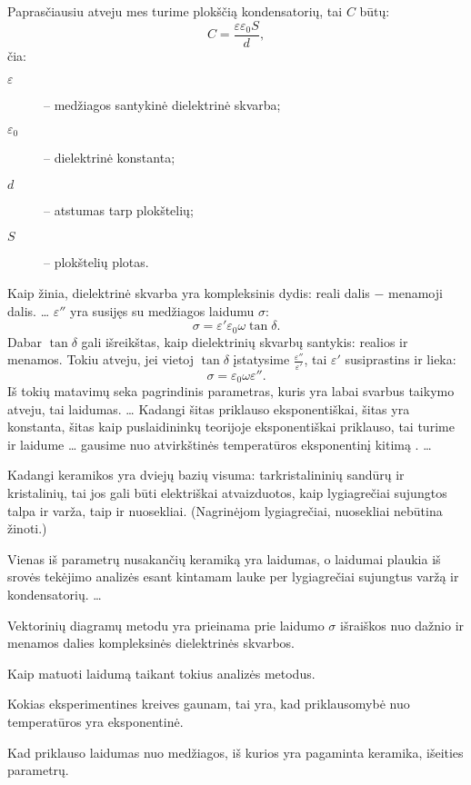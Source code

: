 Paprasčiausiu atveju mes turime plokščią kondensatorių, tai $C$ būtų:
\begin{equation*}
  C = \frac{\varepsilon \varepsilon_{0} S}{d},
\end{equation*}
čia:
\begin{description}
  \item[$\varepsilon$] – medžiagos santykinė dielektrinė skvarba;
  \item[$\varepsilon_{0}$] – dielektrinė konstanta;
  \item[$d$] – atstumas tarp plokštelių;
  \item[$S$] – plokštelių plotas.
\end{description}
Kaip žinia, dielektrinė skvarba yra kompleksinis dydis: reali dalis
$-$ menamoji dalis. … $\varepsilon''$ yra susijęs su medžiagos
laidumu $\sigma$:
\begin{equation*}
  \sigma = \varepsilon' \varepsilon_{0} \omega \tan \delta.
\end{equation*}
Dabar $\tan \delta$ gali išreikštas, kaip dielektrinių skvarbų santykis:
realios ir menamos. Tokiu atveju, jei vietoj $\tan \delta$ įstatysime
$\frac{\varepsilon''}{\varepsilon'}$, tai $\varepsilon'$ susiprastins
ir lieka:
\begin{equation*}
  \sigma = \varepsilon_{0} \omega \varepsilon''.
\end{equation*}
Iš tokių matavimų seka pagrindinis parametras, kuris yra labai
svarbus taikymo atveju, tai laidumas. … Kadangi šitas
priklauso eksponentiškai, šitas yra konstanta, šitas kaip puslaidininkų
teorijoje eksponentiškai priklauso, tai turime ir laidume …
gausime nuo atvirkštinės temperatūros eksponentinį kitimą .
… 

\begin{remember}
  \item Kadangi keramikos yra dviejų bazių visuma: tarkristalininių
    sandūrų ir kristalinių, tai jos gali būti elektriškai atvaizduotos,
    kaip lygiagrečiai sujungtos talpa ir varža, taip ir nuosekliai.
    (Nagrinėjom lygiagrečiai, nuosekliai nebūtina žinoti.)
  \item Vienas iš parametrų nusakančių keramiką yra laidumas, o laidumai
    plaukia iš srovės tekėjimo analizės esant kintamam lauke per
    lygiagrečiai sujungtus varžą ir kondensatorių. …
  \item Vektorinių diagramų metodu yra prieinama prie laidumo
    $\sigma$ išraiškos nuo dažnio ir menamos dalies kompleksinės
    dielektrinės skvarbos.
  \item Kaip matuoti laidumą taikant tokius analizės metodus.
  \item Kokias eksperimentines kreives gaunam, tai yra, kad
    priklausomybė nuo temperatūros yra eksponentinė.
  \item Kad priklauso laidumas nuo medžiagos, iš kurios yra pagaminta
    keramika, išeities parametrų.
\end{remember}



